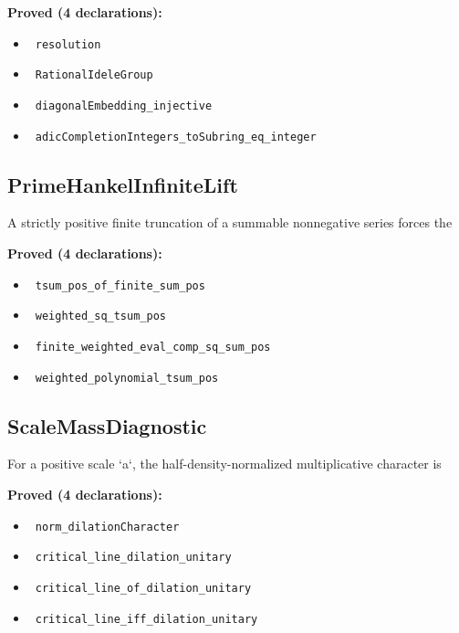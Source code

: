\documentclass{report}
\theoremstyle{definition}
\begin{document}
\noindent\textbf{Proved (4 declarations):}
\begin{itemize}
  \item {}\leanok\ \texttt{resolution}
  \item {}\leanok\ \texttt{RationalIdeleGroup}
  \item {}\leanok\ \texttt{diagonalEmbedding\_injective}
  \item {}\leanok\ \texttt{adicCompletionIntegers\_toSubring\_eq\_integer}
\end{itemize}

\subsection{PrimeHankelInfiniteLift}
A strictly positive finite truncation of a summable nonnegative series forces the

\noindent\textbf{Proved (4 declarations):}
\begin{itemize}
  \item {}\leanok\ \texttt{tsum\_pos\_of\_finite\_sum\_pos}
  \item {}\leanok\ \texttt{weighted\_sq\_tsum\_pos}
  \item {}\leanok\ \texttt{finite\_weighted\_eval\_comp\_sq\_sum\_pos}
  \item {}\leanok\ \texttt{weighted\_polynomial\_tsum\_pos}
\end{itemize}

\subsection{ScaleMassDiagnostic}
For a positive scale `a`, the half-density-normalized multiplicative character is

\noindent\textbf{Proved (4 declarations):}
\begin{itemize}
  \item {}\leanok\ \texttt{norm\_dilationCharacter}
  \item {}\leanok\ \texttt{critical\_line\_dilation\_unitary}
  \item {}\leanok\ \texttt{critical\_line\_of\_dilation\_unitary}
  \item {}\leanok\ \texttt{critical\_line\_iff\_dilation\_unitary}
\end{itemize}
\end{document}

